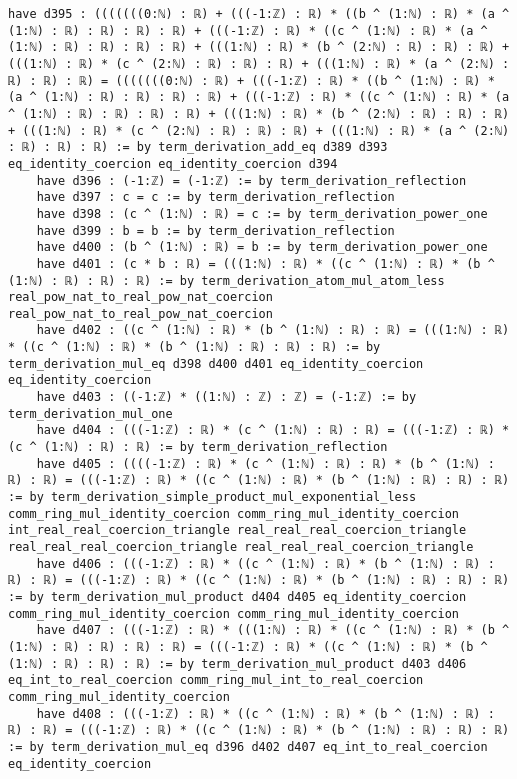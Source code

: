 \documentclass{article}
\begin{document}
\begin{tcolorbox}[colback=white!10, width=\linewidth]
\begin{lstlisting}[language=Lean4]
    have d395 : (((((((0:ℕ) : ℝ) + (((-1:ℤ) : ℝ) * ((b ^ (1:ℕ) : ℝ) * (a ^ (1:ℕ) : ℝ) : ℝ) : ℝ) : ℝ) + (((-1:ℤ) : ℝ) * ((c ^ (1:ℕ) : ℝ) * (a ^ (1:ℕ) : ℝ) : ℝ) : ℝ) : ℝ) + (((1:ℕ) : ℝ) * (b ^ (2:ℕ) : ℝ) : ℝ) : ℝ) + (((1:ℕ) : ℝ) * (c ^ (2:ℕ) : ℝ) : ℝ) : ℝ) + (((1:ℕ) : ℝ) * (a ^ (2:ℕ) : ℝ) : ℝ) : ℝ) = (((((((0:ℕ) : ℝ) + (((-1:ℤ) : ℝ) * ((b ^ (1:ℕ) : ℝ) * (a ^ (1:ℕ) : ℝ) : ℝ) : ℝ) : ℝ) + (((-1:ℤ) : ℝ) * ((c ^ (1:ℕ) : ℝ) * (a ^ (1:ℕ) : ℝ) : ℝ) : ℝ) : ℝ) + (((1:ℕ) : ℝ) * (b ^ (2:ℕ) : ℝ) : ℝ) : ℝ) + (((1:ℕ) : ℝ) * (c ^ (2:ℕ) : ℝ) : ℝ) : ℝ) + (((1:ℕ) : ℝ) * (a ^ (2:ℕ) : ℝ) : ℝ) : ℝ) := by term_derivation_add_eq d389 d393 eq_identity_coercion eq_identity_coercion d394
    have d396 : (-1:ℤ) = (-1:ℤ) := by term_derivation_reflection
    have d397 : c = c := by term_derivation_reflection
    have d398 : (c ^ (1:ℕ) : ℝ) = c := by term_derivation_power_one
    have d399 : b = b := by term_derivation_reflection
    have d400 : (b ^ (1:ℕ) : ℝ) = b := by term_derivation_power_one
    have d401 : (c * b : ℝ) = (((1:ℕ) : ℝ) * ((c ^ (1:ℕ) : ℝ) * (b ^ (1:ℕ) : ℝ) : ℝ) : ℝ) := by term_derivation_atom_mul_atom_less real_pow_nat_to_real_pow_nat_coercion real_pow_nat_to_real_pow_nat_coercion
    have d402 : ((c ^ (1:ℕ) : ℝ) * (b ^ (1:ℕ) : ℝ) : ℝ) = (((1:ℕ) : ℝ) * ((c ^ (1:ℕ) : ℝ) * (b ^ (1:ℕ) : ℝ) : ℝ) : ℝ) := by term_derivation_mul_eq d398 d400 d401 eq_identity_coercion eq_identity_coercion
    have d403 : ((-1:ℤ) * ((1:ℕ) : ℤ) : ℤ) = (-1:ℤ) := by term_derivation_mul_one
    have d404 : (((-1:ℤ) : ℝ) * (c ^ (1:ℕ) : ℝ) : ℝ) = (((-1:ℤ) : ℝ) * (c ^ (1:ℕ) : ℝ) : ℝ) := by term_derivation_reflection
    have d405 : ((((-1:ℤ) : ℝ) * (c ^ (1:ℕ) : ℝ) : ℝ) * (b ^ (1:ℕ) : ℝ) : ℝ) = (((-1:ℤ) : ℝ) * ((c ^ (1:ℕ) : ℝ) * (b ^ (1:ℕ) : ℝ) : ℝ) : ℝ) := by term_derivation_simple_product_mul_exponential_less comm_ring_mul_identity_coercion comm_ring_mul_identity_coercion int_real_real_coercion_triangle real_real_real_coercion_triangle real_real_real_coercion_triangle real_real_real_coercion_triangle
    have d406 : (((-1:ℤ) : ℝ) * ((c ^ (1:ℕ) : ℝ) * (b ^ (1:ℕ) : ℝ) : ℝ) : ℝ) = (((-1:ℤ) : ℝ) * ((c ^ (1:ℕ) : ℝ) * (b ^ (1:ℕ) : ℝ) : ℝ) : ℝ) := by term_derivation_mul_product d404 d405 eq_identity_coercion comm_ring_mul_identity_coercion comm_ring_mul_identity_coercion
    have d407 : (((-1:ℤ) : ℝ) * (((1:ℕ) : ℝ) * ((c ^ (1:ℕ) : ℝ) * (b ^ (1:ℕ) : ℝ) : ℝ) : ℝ) : ℝ) = (((-1:ℤ) : ℝ) * ((c ^ (1:ℕ) : ℝ) * (b ^ (1:ℕ) : ℝ) : ℝ) : ℝ) := by term_derivation_mul_product d403 d406 eq_int_to_real_coercion comm_ring_mul_int_to_real_coercion comm_ring_mul_identity_coercion
    have d408 : (((-1:ℤ) : ℝ) * ((c ^ (1:ℕ) : ℝ) * (b ^ (1:ℕ) : ℝ) : ℝ) : ℝ) = (((-1:ℤ) : ℝ) * ((c ^ (1:ℕ) : ℝ) * (b ^ (1:ℕ) : ℝ) : ℝ) : ℝ) := by term_derivation_mul_eq d396 d402 d407 eq_int_to_real_coercion eq_identity_coercion

\end{lstlisting}
\end{tcolorbox}
\end{document}
